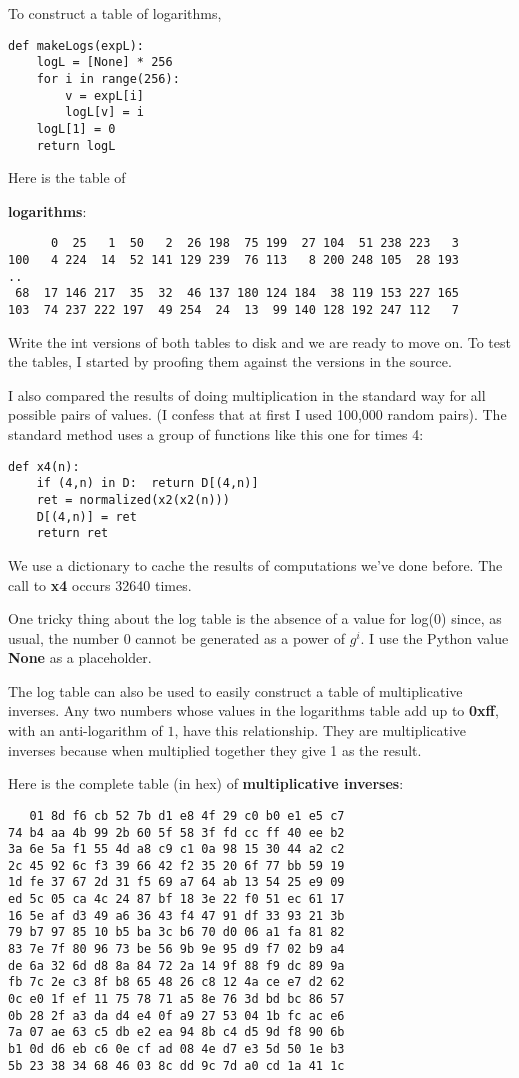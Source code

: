 \documentclass[11pt, oneside]{article}
\begin{document}
To construct a table of logarithms, 
\begin{verbatim}
def makeLogs(expL):
    logL = [None] * 256
    for i in range(256):
        v = expL[i]
        logL[v] = i
    logL[1] = 0
    return logL
\end{verbatim}

Here is the table of

\textbf{logarithms}:
\begin{verbatim}
      0  25   1  50   2  26 198  75 199  27 104  51 238 223   3
100   4 224  14  52 141 129 239  76 113   8 200 248 105  28 193
..
 68  17 146 217  35  32  46 137 180 124 184  38 119 153 227 165
103  74 237 222 197  49 254  24  13  99 140 128 192 247 112   7
\end{verbatim}

Write the int versions of both tables to disk and we are ready to move on.   To test the tables, I started by proofing them against the versions in the source.

I also compared the results of doing multiplication in the standard way for all possible pairs of values.  (I confess that at first I used 100,000 random pairs).  The standard method uses a group of functions like this one for times 4:

\begin{verbatim}
def x4(n):
    if (4,n) in D:  return D[(4,n)]
    ret = normalized(x2(x2(n)))
    D[(4,n)] = ret
    return ret
\end{verbatim}

We use a dictionary to cache the results of computations we've done before.  The call to \textbf{x4} occurs 32640 times.

One tricky thing about the log table is the absence of a value for log(0) since, as usual, the number 0 cannot be generated as a power of $g^i$.  I use the Python value \textbf{None} as a placeholder.

The log table can also be used to easily construct a table of multiplicative inverses.  Any two numbers whose values in the logarithms table add up to \textbf{0xff}, with an anti-logarithm of $1$, have this relationship.  They are multiplicative inverses because when multiplied together they give 1 as the result.

Here is the complete table (in hex) of \textbf{multiplicative inverses}:
\begin{verbatim}
   01 8d f6 cb 52 7b d1 e8 4f 29 c0 b0 e1 e5 c7
74 b4 aa 4b 99 2b 60 5f 58 3f fd cc ff 40 ee b2
3a 6e 5a f1 55 4d a8 c9 c1 0a 98 15 30 44 a2 c2
2c 45 92 6c f3 39 66 42 f2 35 20 6f 77 bb 59 19
1d fe 37 67 2d 31 f5 69 a7 64 ab 13 54 25 e9 09
ed 5c 05 ca 4c 24 87 bf 18 3e 22 f0 51 ec 61 17
16 5e af d3 49 a6 36 43 f4 47 91 df 33 93 21 3b
79 b7 97 85 10 b5 ba 3c b6 70 d0 06 a1 fa 81 82
83 7e 7f 80 96 73 be 56 9b 9e 95 d9 f7 02 b9 a4
de 6a 32 6d d8 8a 84 72 2a 14 9f 88 f9 dc 89 9a
fb 7c 2e c3 8f b8 65 48 26 c8 12 4a ce e7 d2 62
0c e0 1f ef 11 75 78 71 a5 8e 76 3d bd bc 86 57
0b 28 2f a3 da d4 e4 0f a9 27 53 04 1b fc ac e6
7a 07 ae 63 c5 db e2 ea 94 8b c4 d5 9d f8 90 6b
b1 0d d6 eb c6 0e cf ad 08 4e d7 e3 5d 50 1e b3
5b 23 38 34 68 46 03 8c dd 9c 7d a0 cd 1a 41 1c
\end{verbatim}
\end{document}
